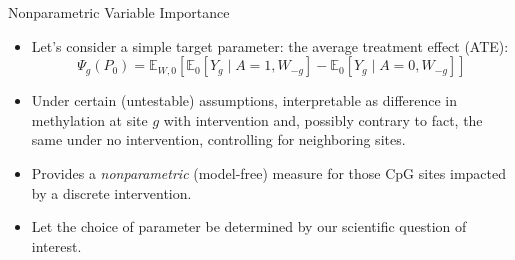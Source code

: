 \documentclass[12pt,t,handout]{beamer}
\begin{document}
\begin{frame}[c]{Nonparametric Variable Importance}

\begin{center}
\begin{itemize}
  \itemsep8pt
  \item Let's consider a simple target parameter: the average treatment effect
    (ATE):
    \[
      \Psi_g(P_0) = \mathbb{E}_{W,0}[\mathbb{E}_0[Y_g \mid A = 1, W_{-g}] -
      \mathbb{E}_0[Y_g \mid A = 0, W_{-g}]]
    \]
  \item Under certain (untestable) assumptions, interpretable as difference in
    methylation at site $g$ with intervention and, possibly contrary to
    fact, the same under no intervention, controlling for neighboring sites.
  \item Provides a \textit{nonparametric} (model-free) measure for those CpG
    sites impacted by a discrete intervention.
  \item Let the choice of parameter be determined by our scientific question of
    interest.
\end{itemize}
\end{center}


\end{frame}

\end{document}
